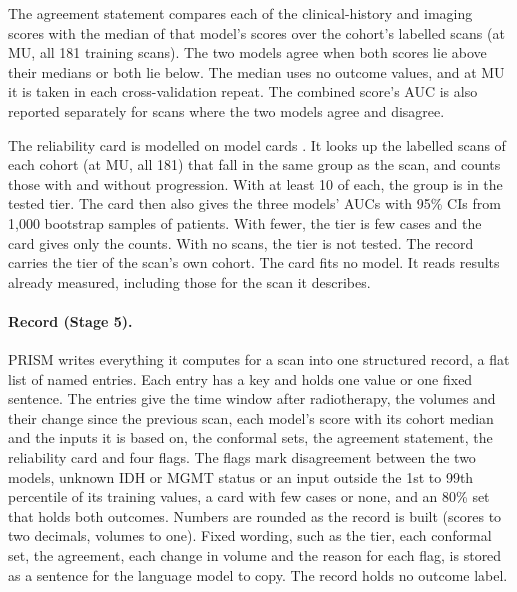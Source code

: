 \documentclass[largeformat]{interact} %
\begin{document}
The agreement statement compares each of the clinical-history and imaging scores with the median of that model's
scores over the cohort's labelled scans (at MU, all 181 training scans). The two models agree when both scores lie above their medians or both lie
below. The median uses no outcome values, and at MU it is taken in each cross-validation repeat. The combined score's
AUC is also reported separately for scans where the two models agree and disagree.

The reliability card is modelled on model cards \citep{mitchell2019}. It looks up the labelled scans of each cohort (at MU, all
181) that fall in the same group as the scan, and counts those with and without progression. With at least 10 of each, the
group is in the tested tier. The card then also gives the three models' AUCs with 95\% CIs from 1,000 bootstrap
samples of patients. With fewer, the tier is few cases and the card gives only the counts.
With no scans, the tier is not tested. The record carries the tier of the scan's own cohort. The card fits no model.
It reads results already measured, including those for the scan it describes.

\paragraph*{Record (Stage 5).} PRISM writes everything it computes for a scan into one structured record, a flat list of named
entries. Each entry has a key and holds one value or one fixed sentence. The
entries give the time window after radiotherapy, the volumes and their change since the previous scan, each model's score
with its cohort median and the inputs it is based on, the conformal sets, the agreement statement, the reliability
card and four flags. The flags mark disagreement between the two models, unknown IDH or MGMT status or an input outside
the 1st to 99th percentile of its training values, a card with few cases or none, and an 80\% set that holds both
outcomes. Numbers are rounded as the record is built (scores
to two decimals, volumes to one). Fixed wording, such as the tier, each conformal set, the
agreement, each change in volume and the reason for each flag, is stored as a sentence for the language model to
copy. The record holds no outcome label.
\end{document}
